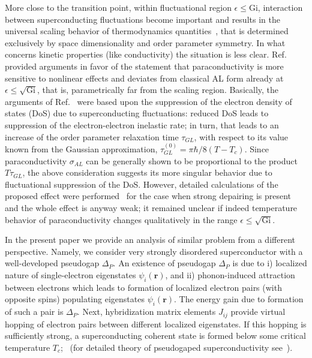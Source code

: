 \documentclass[twocolumn,english,prb]{revtex4-1}
\begin{document}
More close to the transition point, within fluctuational region 
$\epsilon \leq \mathrm{Gi}$,  interaction between superconducting fluctuations become important and results in 
the universal scaling behavior of thermodynamics quantities~\cite{PokrovskiiPatashinskiiBook}, that is determined
exclusively by space dimensionality and order parameter symmetry.
In what concerns kinetic properties (like conductivity) the situation is less clear.
Ref.~ provided arguments in favor of the statement that paraconductivity is more sensitive 
to nonlinear effects and deviates from classical AL form already at $\epsilon \leq \sqrt{\mathrm{Gi}}$,
that is, parametrically far from the scaling region.  Basically, the arguments of Ref.~ were based
upon the suppression of the electron density of states (DoS) due to  superconducting fluctuations: reduced DoS leads to
suppression of the electron-electron inelastic rate; in turn, that leads to an increase of the order parameter 
relaxation time $\tau_{GL}$, with respect to its value known from the Gaussian approximation, 
$\tau_{GL}^{(0)} = \pi \hbar/8(T-T_c)$.  Since paraconductivity $\sigma_{AL}$ can be generally shown to be 
proportional to the product $T\tau_{GL}$, the above consideration suggests its more singular behavior due to
fluctuational suppression of the DoS. However, detailed calculations of the proposed effect were
performed~\cite{LO2001}  for the case when strong depairing is present and the whole effect  is anyway weak;
it remained unclear if indeed temperature behavior of paraconductivity changes qualitatively in the range
$\epsilon \leq \sqrt{\mathrm{Gi}}$.

In the present paper we provide an analysis of similar problem from a different perspective. Namely, we consider
very strongly disordered superconductor with a well-developed pseudogap $\Delta_P$.   
An existence of pseudogap $\Delta_P$ is due to i) localized nature of single-electron eigenstates $\psi_i(\boldsymbol{r})$,
 and ii) phonon-induced attraction between electrons
which leads to formation of localized electron pairs (with opposite spins) populating eigenstates $\psi_i(\boldsymbol{r})$.
The energy gain due to formation of such a pair is $\Delta_P$.  Next, hybridization matrix elements $J_{ij}$
provide virtual hopping of electron pairs between different localized eigenstates. If this hopping is sufficiently
strong, a superconducting coherent state is formed below some critical temperature $T_c$; \, 
(for detailed theory of pseudogaped superconductivity see~\cite{t2}).
\end{document}
